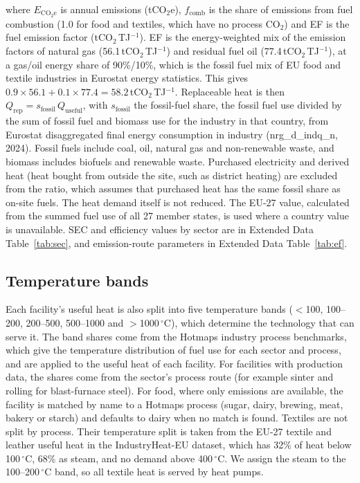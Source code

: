 \documentclass[11pt]{article}
\begin{document}
where $E_{\mathrm{CO_2e}}$ is annual emissions (tCO$_2$e), $f_{\mathrm{comb}}$ is the share of emissions from fuel combustion (1.0 for food and textiles, which have no process CO$_2$) and EF is the fuel emission factor (tCO$_2$\,TJ$^{-1}$). EF is the energy-weighted mix of the emission factors of natural gas (56.1\,tCO$_2$\,TJ$^{-1}$) and residual fuel oil (77.4\,tCO$_2$\,TJ$^{-1}$)\cite{ipcc2006stationary}, at a gas/oil energy share of 90\%/10\%, which is the fossil fuel mix of EU food and textile industries in Eurostat energy statistics\cite{eurostat_nrg_d_indq}. This gives $0.9\times56.1+0.1\times77.4=58.2$\,tCO$_2$\,TJ$^{-1}$. Replaceable heat is then $Q_{\mathrm{rep}} = s_{\mathrm{fossil}}\, Q_{\mathrm{useful}}$, with $s_{\mathrm{fossil}}$ the fossil-fuel share, the fossil fuel use divided by the sum of fossil fuel and biomass use for the industry in that country, from Eurostat disaggregated final energy consumption in industry (nrg\_d\_indq\_n, 2024)\cite{eurostat_nrg_d_indq_n}. Fossil fuels include coal, oil, natural gas and non-renewable waste, and biomass includes biofuels and renewable waste. Purchased electricity and derived heat (heat bought from outside the site, such as district heating) are excluded from the ratio, which assumes that purchased heat has the same fossil share as on-site fuels. The heat demand itself is not reduced. The EU-27 value, calculated from the summed fuel use of all 27 member states, is used where a country value is unavailable. SEC and efficiency values by sector are in Extended Data Table~\ref{tab:sec}, and emission-route parameters in Extended Data Table~\ref{tab:ef}.

\subsection*{Temperature bands}
Each facility's useful heat is also split into five temperature bands ($<$100, 100--200, 200--500, 500--1000 and $>$1000\,$^\circ$C), which determine the technology that can serve it. The band shares come from the Hotmaps industry process benchmarks\cite{hotmaps2018}, which give the temperature distribution of fuel use for each sector and process, and are applied to the useful heat of each facility. For facilities with production data, the shares come from the sector's process route (for example sinter and rolling for blast-furnace steel). For food, where only emissions are available, the facility is matched by name to a Hotmaps process (sugar, dairy, brewing, meat, bakery or starch) and defaults to dairy when no match is found. Textiles are not split by process. Their temperature split is taken from the EU-27 textile and leather useful heat in the IndustryHeat-EU dataset\cite{madeddu2020}, which has 32\% of heat below 100\,$^\circ$C, 68\% as steam, and no demand above 400\,$^\circ$C. We assign the steam to the 100--200\,$^\circ$C band, so all textile heat is served by heat pumps.
\end{document}
